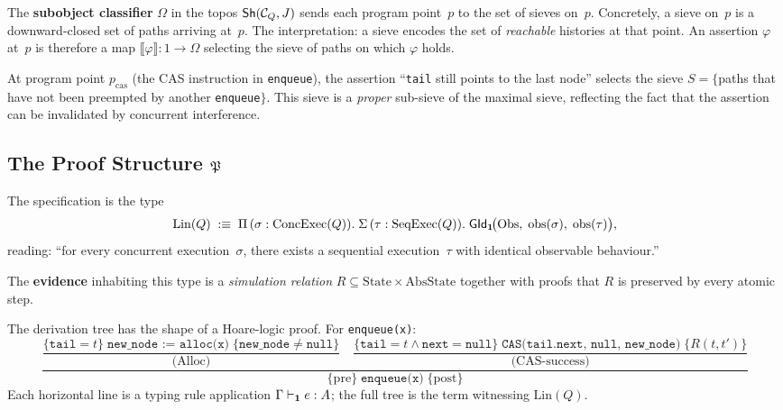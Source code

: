 The \textbf{subobject classifier} $\Omega$ in the topos
$\mathsf{Sh}(\mathcal{C}_Q,J)$ sends each program point~$p$ to the set of
sieves on~$p$.  Concretely, a sieve on~$p$ is a downward-closed set
of paths arriving at~$p$.  The interpretation: a sieve encodes the
set of \emph{reachable} histories at that point.  An assertion
$\varphi$ at~$p$ is therefore a map
$\llbracket\varphi\rrbracket:1\to\Omega$ selecting the sieve of
paths on which $\varphi$ holds.

\begin{example}
At program point $p_{\mathrm{cas}}$ (the CAS instruction in
\texttt{enqueue}), the assertion ``\texttt{tail} still points to the
last node'' selects the sieve
$S = \{$paths that have not been preempted by another
\texttt{enqueue}$\}$.  This sieve is a \emph{proper} sub-sieve of
the maximal sieve, reflecting the fact that the assertion can be
invalidated by concurrent interference.
\end{example}

\subsection{The Proof Structure $\mathfrak{P}$}

\begin{construction}
\label{con:spec-type}
The specification is the type
\[
  \mathrm{Lin}(Q)
  \;:\equiv\;
  \Pi\,(\sigma:\mathrm{ConcExec}(Q)).\;
  \Sigma\,(\tau:\mathrm{SeqExec}(Q)).\;
  \mathsf{GId}_{\mathbf{1}}\!\bigl(\mathrm{Obs},\;
    \mathrm{obs}(\sigma),\;\mathrm{obs}(\tau)\bigr),
\]
reading: ``for every concurrent execution~$\sigma$, there exists a
sequential execution~$\tau$ with identical observable behaviour.''
\end{construction}

The \textbf{evidence} inhabiting this type is a \emph{simulation
relation} $R\subseteq\mathrm{State}\times\mathrm{AbsState}$ together
with proofs that $R$ is preserved by every atomic step.

\begin{construction}
\label{con:hoare-tree}
The derivation tree has the shape of a Hoare-logic proof.
For \texttt{enqueue(x)}:
\[
  \dfrac{
    \dfrac{
      \{\texttt{tail}=t\}
      \;\texttt{new\_node := alloc(x)}\;
      \{\texttt{new\_node}\neq\texttt{null}\}
    }{\text{(Alloc)}}
    \quad
    \dfrac{
      \{\texttt{tail}=t \wedge \texttt{next}=\texttt{null}\}
      \;\texttt{CAS(tail.next, null, new\_node)}\;
      \{R(t,t')\}
    }{\text{(CAS-success)}}
  }{
    \{\mathrm{pre}\}\;\texttt{enqueue(x)}\;\{\mathrm{post}\}
  }
\]
Each horizontal line is a typing rule application
$\Gamma\vdash_{\mathbf{1}} e:A$; the full tree is the term witnessing
$\mathrm{Lin}(Q)$.
\end{construction}

